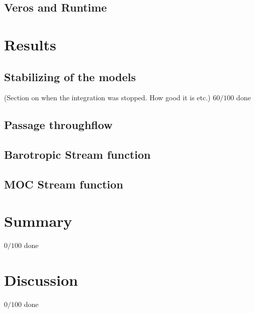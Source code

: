 \documentclass[a4paper]{article}
\begin{document}
\begin{multicols}{2}




\subsection{Veros and Runtime}


\section{Results}
\subsection{Stabilizing of the models}
(Section on when the integration was stopped. How good it is etc.)
$60/100$ done


\subsection{Passage throughflow}


\subsection{Barotropic Stream function}
\label{sec:BSF}


\subsection{MOC Stream function}




\section{Summary}
%
$0/100$ done

\section{Discussion}

$0/100$ done


%

\printbibliography

\end{multicols}
\end{document}

